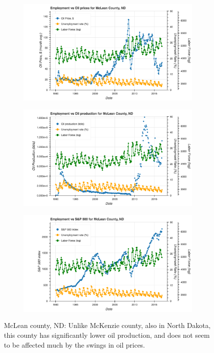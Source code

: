 \documentclass[11pt,letterpaper]{article}
\begin{document}
\begin{figure}
\centering
\begin{subfigure}{0.6\textwidth}
\includegraphics[width=\linewidth]{nd_mclean_oil_price}
\end{subfigure}

\begin{subfigure}{0.6\textwidth}
\includegraphics[width=\linewidth]{nd_mclean_oil_prod}
\end{subfigure}

\begin{subfigure}{0.6\textwidth}
\includegraphics[width=\linewidth]{nd_mclean_snp}
\end{subfigure}
\caption{McLean county, ND: Unlike McKenzie county, also in North Dakota, this county has significantly lower oil production, and does not seem to be affected much by the swings in oil prices.}
\label{fig:nd_mclean}
\end{figure}
\end{document}
